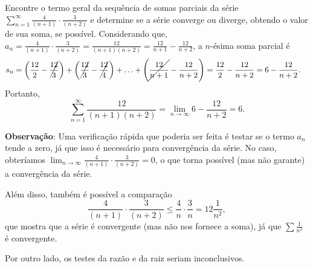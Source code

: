 \documentclass[12pt,a4paper]{article}
\begin{document}
\begin{ExerciseList}
\Exercise[title={2,0}] Encontre o termo geral da sequência de somas parciais da série $\displaystyle \sum_{n = 1}^{\infty} \frac{4}{(n + 1)} \cdot \frac{3}{(n + 2)}$ e determine se a série converge ou diverge, obtendo o valor de sua soma, se possível.
\Answer Considerando que, $a_n = \frac{4}{(n + 1)} \cdot \frac{3}{(n + 2)} = \frac{12}{(n + 1) (n + 2)} = \frac{12}{n + 1} - \frac{12}{n+2}$, a $n$-ésima soma parcial é
\begin{align*}
    s_n
    & = \left(\frac{12}{2} - \cancel{\frac{12}{3}}\right) + \left(\cancel{\frac{12}{3}} - \cancel{\frac{12}{4}}\right) + \ldots + \left(\cancel{\frac{12}{n + 1}} - \frac{12}{n+2}\right)
        = \frac{12}{2} - \frac{12}{n+2}
        = 6 - \frac{12}{n+2}.
\end{align*}
Portanto,
\[
\sum_{n = 1}^{\infty} \frac{12}{(n + 1)(n + 2)} = \lim_{n \to \infty} 6 - \frac{12}{n+2} = 6.
\]

\textbf{Observação}: Uma verificação rápida que poderia ser feita é testar se o termo $a_n$ tende a zero, já que isso é necessário para convergência da série. No caso, obteríamos $\lim_{n \to \infty} \frac{4}{(n + 1)} \cdot \frac{3}{(n + 2)} = 0$, o que torna possível (mas não garante) a convergência da série.

Além disso, também é possível a comparação
\[
     \frac{4}{(n + 1)} \cdot \frac{3}{(n + 2)}
\leq \frac{4}{n} \cdot \frac{3}{n}
= 12 \frac{1}{n^2},
\]
que mostra que a série é convergente (mas não nos fornece a soma), já que $\sum \frac{1}{n^2}$ é convergente.

Por outro lado, os testes da razão e da raiz seriam inconclusivos.



\end{ExerciseList}
\end{document}
